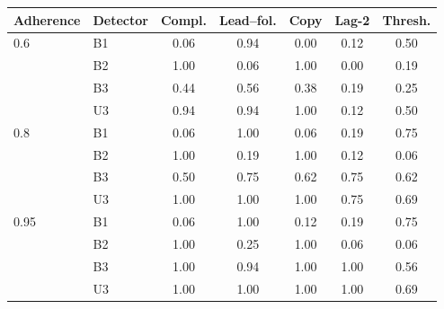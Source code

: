 \begin{tabular}{llccccc}
\toprule
Adherence & Detector & Compl. & Lead--fol. & Copy & Lag-2 & Thresh. \\
\midrule
0.6 & B1 & 0.06 & 0.94 & 0.00 & 0.12 & 0.50 \\
 & B2 & 1.00 & 0.06 & 1.00 & 0.00 & 0.19 \\
 & B3 & 0.44 & 0.56 & 0.38 & 0.19 & 0.25 \\
 & U3 & 0.94 & 0.94 & 1.00 & 0.12 & 0.50 \\
\midrule
0.8 & B1 & 0.06 & 1.00 & 0.06 & 0.19 & 0.75 \\
 & B2 & 1.00 & 0.19 & 1.00 & 0.12 & 0.06 \\
 & B3 & 0.50 & 0.75 & 0.62 & 0.75 & 0.62 \\
 & U3 & 1.00 & 1.00 & 1.00 & 0.75 & 0.69 \\
\midrule
0.95 & B1 & 0.06 & 1.00 & 0.12 & 0.19 & 0.75 \\
 & B2 & 1.00 & 0.25 & 1.00 & 0.06 & 0.06 \\
 & B3 & 1.00 & 0.94 & 1.00 & 1.00 & 0.56 \\
 & U3 & 1.00 & 1.00 & 1.00 & 1.00 & 0.69 \\
\bottomrule
\end{tabular}

